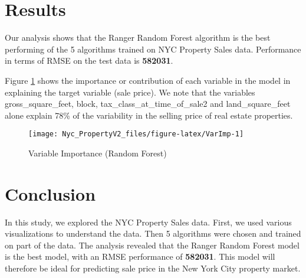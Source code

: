 \documentclass[
]{article}
\begin{document}
\hypertarget{results}{%
\section{Results}\label{results}}

Our analysis shows that the Ranger Random Forest algorithm is the best performing of the 5 algorithms trained on NYC Property Sales data. Performance in terms of RMSE on the test data is \textbf{582031}.

Figure \ref{fig:VarImp} shows the importance or contribution of each variable in the model in explaining the target variable (sale price). We note that the variables gross\_square\_feet, block, tax\_class\_at\_time\_of\_sale2 and land\_square\_feet alone explain 78\% of the variability in the selling price of real estate properties.

\begin{table}[H]
\centering
\caption{\label{tab:Modelres2}Performance of the final algorithm.}
\centering
{}
\end{table}

\begin{figure}[H]

{\centering \texttt{[image: Nyc\_PropertyV2\_files/figure-latex/VarImp-1]} 

}

\caption{Variable Importance (Random Forest)}\label{fig:VarImp}
\end{figure}

\hypertarget{conclusion}{%
\section{Conclusion}\label{conclusion}}

In this study, we explored the NYC Property Sales data. First, we used various visualizations to understand the data. Then 5 algorithms were chosen and trained on part of the data. The analysis revealed that the Ranger Random Forest model is the best model, with an RMSE performance of \textbf{582031}. This model will therefore be ideal for predicting sale price in the New York City property market.
\end{document}
